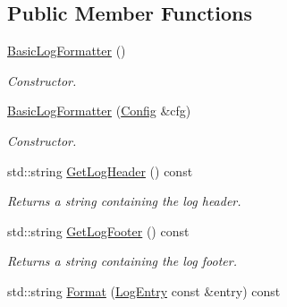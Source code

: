 \subsection*{Public Member Functions}
\begin{DoxyCompactItemize}
\item 
\hypertarget{class_common_1_1_basic_log_formatter_a222b31419556695e1e824a3bac91de21}{\hyperlink{class_common_1_1_basic_log_formatter_a222b31419556695e1e824a3bac91de21}{Basic\-Log\-Formatter} ()}\label{class_common_1_1_basic_log_formatter_a222b31419556695e1e824a3bac91de21}

\begin{DoxyCompactList}\small\item\em Constructor. \end{DoxyCompactList}\item 
\hyperlink{class_common_1_1_basic_log_formatter_aa235218f27c5ea10eea2bbb5270e8a65}{Basic\-Log\-Formatter} (\hyperlink{class_common_1_1_config}{Config} \&cfg)
\begin{DoxyCompactList}\small\item\em Constructor. \end{DoxyCompactList}\item 
\hypertarget{class_common_1_1_basic_log_formatter_a01e4739ce34a498897f7845ce91206f5}{std\-::string \hyperlink{class_common_1_1_basic_log_formatter_a01e4739ce34a498897f7845ce91206f5}{Get\-Log\-Header} () const }\label{class_common_1_1_basic_log_formatter_a01e4739ce34a498897f7845ce91206f5}

\begin{DoxyCompactList}\small\item\em Returns a string containing the log header. \end{DoxyCompactList}\item 
\hypertarget{class_common_1_1_basic_log_formatter_ae4208ec2997454c571672de0dcdc3051}{std\-::string \hyperlink{class_common_1_1_basic_log_formatter_ae4208ec2997454c571672de0dcdc3051}{Get\-Log\-Footer} () const }\label{class_common_1_1_basic_log_formatter_ae4208ec2997454c571672de0dcdc3051}

\begin{DoxyCompactList}\small\item\em Returns a string containing the log footer. \end{DoxyCompactList}\item 
\hypertarget{class_common_1_1_basic_log_formatter_a3abc6346a953c56745df04acb7d30067}{std\-::string \hyperlink{class_common_1_1_basic_log_formatter_a3abc6346a953c56745df04acb7d30067}{Format} (\hyperlink{class_common_1_1_log_entry}{Log\-Entry} const \&entry) const }\label{class_common_1_1_basic_log_formatter_a3abc6346a953c56745df04acb7d30067}


\end{DoxyCompactItemize}

